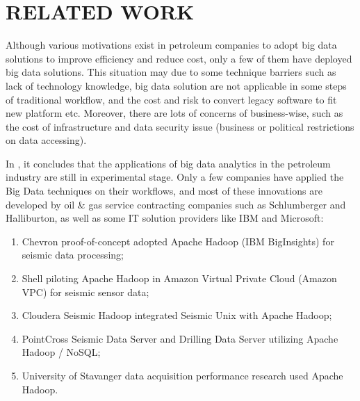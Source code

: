 %
%
%

\chapter{\uppercase{Related Work}}


Although various motivations exist in petroleum companies to adopt big data solutions to improve efficiency and reduce cost, only a few of them have deployed big data solutions. This situation may due to some technique barriers such as lack of technology knowledge, big data solution are not applicable in some steps of traditional workflow, and the cost and risk to convert legacy software to fit new platform etc. Moreover, there are lots of concerns of business-wise, such as the cost of infrastructure and data security issue (business or political restrictions on data accessing). 

In \cite{bigdatatooil}, it concludes that the applications of big data analytics in the petroleum industry are still in experimental stage. Only a few companies have applied the Big Data techniques on their workflows, and most of these innovations are developed by oil \& gas service contracting companies such as Schlumberger and Halliburton, as well as some IT solution providers like IBM and Microsoft: \\

\begin{enumerate}
  \item Chevron proof-of-concept adopted Apache Hadoop (IBM BigInsights) for seismic data processing;
  \item Shell piloting Apache Hadoop in Amazon Virtual Private Cloud (Amazon VPC) for seismic sensor data;
  \item Cloudera Seismic Hadoop integrated Seismic Unix with Apache Hadoop;
  \item PointCross Seismic Data Server and Drilling Data Server utilizing Apache Hadoop / NoSQL;
  \item University of Stavanger data acquisition performance research used Apache Hadoop.
\end{enumerate}



